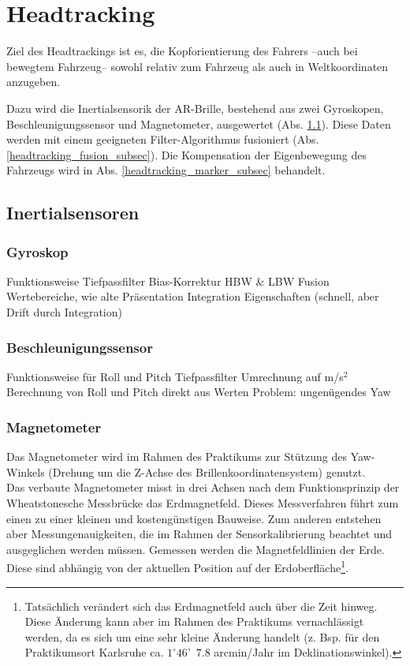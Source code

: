 
\section{Headtracking}

Ziel des Headtrackings ist es, die Kopforientierung des Fahrers --auch bei bewegtem Fahrzeug-- sowohl relativ zum Fahrzeug als auch in Weltkoordinaten anzugeben.

Dazu wird die Inertialsensorik der \ac{AR}-Brille, bestehend aus zwei Gyroskopen, Beschleunigungssensor und Magnetometer, ausgewertet (Abs. \ref{headtracking_imu_subsec}).
Diese Daten werden mit einem geeigneten Filter-Algorithmus fusioniert (Abs. \ref{headtracking_fusion_subsec}).
Die Kompensation der Eigenbewegung des Fahrzeugs wird in Abs. \ref{headtracking_marker_subsec} behandelt.


\subsection{Inertialsensoren}
\label{headtracking_imu_subsec}


\subsubsection{Gyroskop}

Funktionsweise
Tiefpassfilter
Bias-Korrektur
HBW \& LBW Fusion
Wertebereiche, wie alte Präsentation
Integration
Eigenschaften (schnell, aber Drift durch Integration)


\subsubsection{Beschleunigungssensor}

Funktionsweise
für Roll und Pitch
Tiefpassfilter
Umrechnung auf m/s$^2$
Berechnung von Roll und Pitch direkt aus Werten
Problem: ungenügendes Yaw


\subsubsection{Magnetometer}
\label{headtracking_magnetometer_subsubsec}

Das Magnetometer wird im Rahmen des Praktikums zur Stützung des Yaw-Winkels (Drehung um die Z-Achse des Brillenkoordinatensystem) genutzt.\\
Das verbaute Magnetometer misst in drei Achsen nach dem Funktionsprinzip der Wheatstonesche Messbrücke \cite{renaudin2010complete} das Erdmagnetfeld.
Dieses Messverfahren führt zum einen zu einer kleinen und kostengünstigen Bauweise.
Zum anderen entstehen aber Messungenauigkeiten, die im Rahmen der Sensorkalibrierung beachtet und ausgeglichen werden müssen.
Gemessen werden die Magnetfeldlinien der Erde.
Diese sind abhängig von der aktuellen Position auf der Erdoberfläche\footnote{Tatsächlich verändert sich das Erdmagnetfeld auch über die Zeit hinweg.
Diese Änderung kann aber im Rahmen des Praktikums vernachlässigt werden, da es sich um eine sehr kleine Änderung handelt (z. Bsp. für den Praktikumsort Karlsruhe ca. $1^\circ 46$'~$7.8$ arcmin/Jahr im Deklinationswinkel).}.

